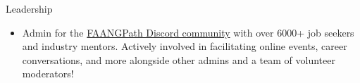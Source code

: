\documentclass{resume} %
\begin{document}

\begin{rSection}{Leadership} 

\begin{itemize}

    \item Admin for the \href{https://discord.com/invite/WWbjEaZ}{FAANGPath Discord community} with over 6000+ job seekers and industry mentors. Actively involved in facilitating online events, career conversations, and more alongside other admins and a team of volunteer moderators! 

\end{itemize}





\end{rSection}
\end{document}
